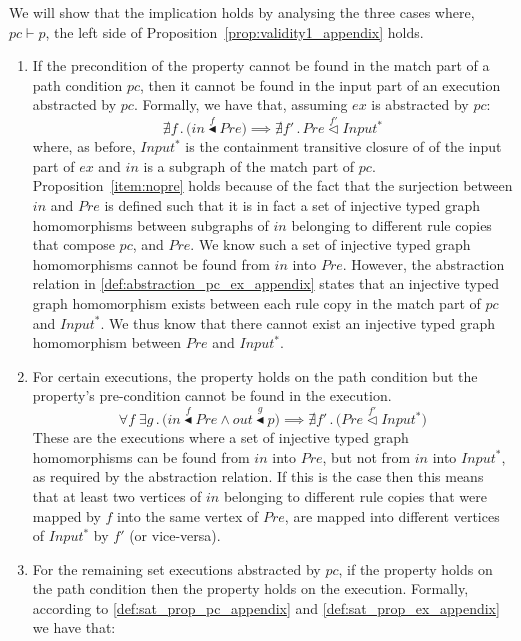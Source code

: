 \begin{pf}
We will show that the implication holds by analysing the three cases where, $pc\vdash p$, the left side of Proposition~\ref{prop:validity1_appendix} holds.  
\begin{enumerate}
  \item If the precondition of the property cannot be found in the match part of a path condition $pc$, then it cannot be found in the input part of an execution abstracted by $pc$. Formally, we have that, assuming $ex$ is abstracted by $pc$:
\begin{equation}
\label{item:nopre}
\nexists f\,.\,\big(in\stackrel{f}{\blacktriangleleft} Pre\big) \implies \nexists f'\,.\, Pre \stackrel{f'}{\vartriangleleft} Input^{*}
\end{equation}
where, as before, $Input^{*}$ is the containment transitive closure of of the input part of $ex$ and $in$ is a subgraph of the match part of $pc$. Proposition~\ref{item:nopre} holds because of the fact that the surjection between $in$ and $Pre$ is defined such that it is in fact a set of injective typed graph homomorphisms between subgraphs of $in$ belonging to different rule copies that compose $pc$, and $Pre$. We know such a set of injective typed graph homomorphisms cannot be found from $in$ into $Pre$. However, the abstraction relation in \cref{def:abstraction_pc_ex_appendix} states that an injective typed graph homomorphism exists between each rule copy in the match part of $pc$ and $Input^{*}$. We thus know that there cannot exist an injective typed graph homomorphism between $Pre$ and $Input^{*}$. 
  \item For certain executions, the property holds on the path condition but the property's pre-condition cannot be found in the execution.
\begin{equation}
\label{item:prepostnotholds}
\forall f\; \exists g\,.\,\big(in\stackrel{f}{\blacktriangleleft} Pre \land out \stackrel{g}\blacktriangleleft p\big) \implies \nexists f'\,.\,\big(Pre \stackrel{f'}{\vartriangleleft} Input^{*}\big)
\end{equation}
These are the executions where a set of injective typed graph homomorphisms can be found from $in$ into $Pre$, but not from $in$ into $Input^{*}$, as required by the abstraction relation. If this is the case then this means that at least two vertices of $in$ belonging to different rule copies that were mapped by $f$ into the same vertex of $Pre$, are mapped into different vertices of $Input^{*}$ by $f'$ (or vice-versa). 
  \item For the remaining set executions abstracted by $pc$, if the property holds on the path condition then the property holds on the execution. Formally, according to \cref{def:sat_prop_pc_appendix} and \cref{def:sat_prop_ex_appendix} we have that:

\end{enumerate}
\end{pf}
